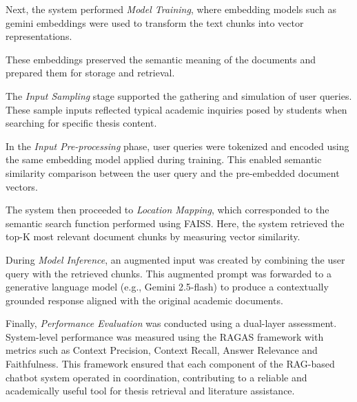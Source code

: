 \begin{refsection}
Next, the system performed \textit{Model Training}, where embedding models such as gemini embeddings were used to transform the text chunks into vector representations.


These embeddings preserved the semantic meaning of the documents and prepared them for storage and retrieval.

The \textit{Input Sampling} stage supported the gathering and simulation of user queries. These sample inputs reflected typical academic inquiries posed by students when searching for specific thesis content.

In the \textit{Input Pre-processing} phase, user queries were tokenized and encoded using the same embedding model applied during training. This enabled semantic similarity comparison between the user query and the pre-embedded document vectors.

The system then proceeded to \textit{Location Mapping}, which corresponded to the semantic search function performed using FAISS. Here, the system retrieved the top-K most relevant document chunks by measuring vector similarity.

During \textit{Model Inference}, an augmented input was created by combining the user query with the retrieved chunks. This augmented prompt was forwarded to a generative language model (e.g., Gemini 2.5-flash) to produce a contextually grounded response aligned with the original academic documents.

Finally, \textit{Performance Evaluation} was conducted using a dual-layer assessment. System-level performance was measured using the RAGAS framework with metrics such as Context Precision, Context Recall, Answer Relevance and Faithfulness. This framework ensured that each component of the RAG-based chatbot system operated in coordination, contributing to a reliable and academically useful tool for thesis retrieval and literature assistance.

\clearpage

\printbibliography[heading=subbibintoc, title={\centering Notes}]
\end{refsection}
